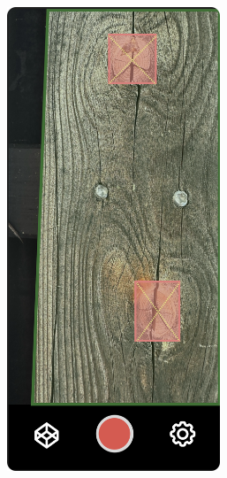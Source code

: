 \begin{figure}[ht]
\begin{subfigure}[b]{0.3\textwidth}
        \includegraphics[width=0.7\textwidth]{Master Thesis/Images/Section_3/Mock/3-Mock4.png}
    \end{subfigure}
     \hfill
    \begin{subfigure}[b]{0.3\textwidth}

\end{subfigure}
\end{figure}
